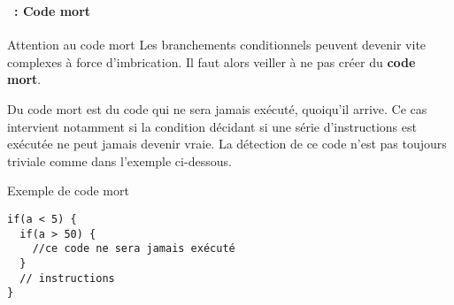 \begin{frame}[containsverbatim]
  \frametitle{\secname}
  \framesubtitle{\subsecname~: Code mort}

  \begin{alertblock}{Attention au code mort}
    Les branchements conditionnels peuvent devenir vite complexes à force d'imbrication. Il faut alors veiller à ne pas créer du \textbf{code mort}.
    \vspace{0.3cm}
    \par
    Du code mort est du code qui ne sera jamais exécuté, quoiqu'il arrive. Ce cas intervient notamment si la condition décidant si une série d'instructions est exécutée
    ne peut jamais devenir vraie. La détection de ce code n'est pas toujours triviale comme dans l'exemple ci-dessous.
  \end{alertblock}
  {\footnotesize\begin{exampleblock}{Exemple de code mort}
    \begin{verbatim}
if(a < 5) {
  if(a > 50) {
    //ce code ne sera jamais exécuté 
  }
  // instructions
}\end{verbatim}
  \end{exampleblock}}
\end{frame}

